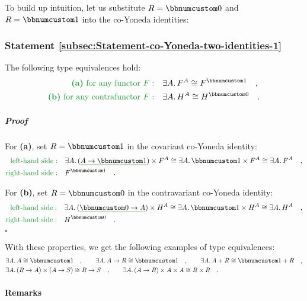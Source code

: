 To build up intuition, let us substitute $R=\bbnum 0$ and $R=\bbnum 1$
into the co-Yoneda identities:

\subsubsection{Statement \label{subsec:Statement-co-Yoneda-two-identities-1}\ref{subsec:Statement-co-Yoneda-two-identities-1}}

The following type equivalences hold:
\begin{align*}
{\color{greenunder}\text{\textbf{(a)} for any functor }F:}\quad & \exists A.\,F^{A}\cong F^{\bbnum 1}\quad,\\
{\color{greenunder}\text{\textbf{(b)} for any contrafunctor }F:}\quad & \exists A.\,H^{A}\cong H^{\bbnum 0}\quad.
\end{align*}


\subparagraph{Proof}

For \textbf{(a)}, set $R=\bbnum 1$ in the covariant co-Yoneda identity:
\begin{align*}
{\color{greenunder}\text{left-hand side}:}\quad & \exists A.\,(\gunderline{A\rightarrow\bbnum 1})\times F^{A}\cong\exists A.\,\bbnum 1\times F^{A}\cong\exists A.\,F^{A}\quad,\\
{\color{greenunder}\text{right-hand side}:}\quad & F^{\bbnum 1}\quad.
\end{align*}

For \textbf{(b)}, set $R=\bbnum 0$ in the contravariant co-Yoneda
identity:
\begin{align*}
{\color{greenunder}\text{left-hand side}:}\quad & \exists A.\,(\gunderline{\bbnum 0\rightarrow A})\times H^{A}\cong\exists A.\,\bbnum 1\times H^{A}\cong\exists A.\,H^{A}\quad,\\
{\color{greenunder}\text{right-hand side}:}\quad & H^{\bbnum 0}\quad.
\end{align*}
 $\square$

With these properties, we get the following examples of type equivalences:
\begin{align*}
 & \exists A.\,A\cong\bbnum 1\quad,\quad\quad\exists A.\,A\rightarrow R\cong\bbnum 1\quad,\quad\quad\exists A.\,A+R\cong\bbnum 1+R\quad,\\
 & \exists A.\,(R\rightarrow A)\times(A\rightarrow S)\cong R\rightarrow S\quad,\quad\quad\exists A.\,(A\rightarrow R)\times A\times A\cong R\times R\quad.
\end{align*}


\paragraph{Remarks}

